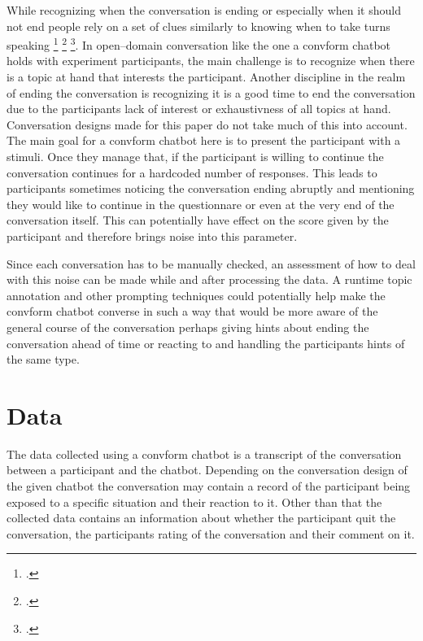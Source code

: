 \documentclass[12pt]{report}
\begin{document}
{While recognizing when the conversation is ending
or especially when it should not end
people rely on a set of clues
similarly to knowing when to take turns speaking \footcite{closing1} \footcite{davidson1975ending} \footcite{coppock2005politeness}.
In open–domain conversation
like the one a convform chatbot holds with experiment participants,
the main challenge is to recognize
when there is a topic at hand
that interests the participant.
Another discipline in the realm of ending the conversation
is recognizing it is a good time to end the conversation
due to the participants lack of interest or exhaustivness of all topics at hand.
Conversation designs made for this paper
do not take much of this into account.
The main goal for a convform chatbot here
is to present the participant with a stimuli.
Once they manage that,
if the participant is willing to continue
the conversation continues for a hardcoded number of responses.
This leads to participants sometimes noticing
the conversation ending abruptly
and mentioning they would like to continue
in the questionnare
or even at the very end of the conversation itself.
This can potentially have effect on
the score given by the participant
and therefore brings noise into this parameter.

\par
Since each conversation has to be manually checked,
an assessment of how to deal with this noise can be made
while and after processing the data.
A runtime topic annotation
and other prompting techniques
could potentially help make
the convform chatbot converse in such a way
that would be more aware of the general course of the conversation
perhaps giving hints about ending the conversation ahead of time
or reacting to and handling the participants hints of the same type.

\chapter{Data}

The data collected using a convform chatbot
is a transcript of the conversation
between a participant and the chatbot.
Depending on the conversation design of the given chatbot
the conversation may contain a record of
the participant being exposed to a specific situation
and their reaction to it.
Other than that the collected data contains
an information about whether the participant quit the conversation,
the participants rating of the conversation
and their comment on it.

}
\end{document}
